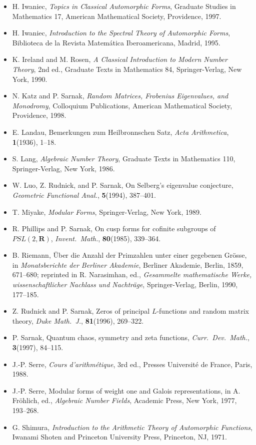 \begin{itemize}[leftmargin=4.6em,itemsep=0.22em,topsep=0.3em,label={}]
\item[{[I1]}] H. Iwaniec, \emph{Topics in Classical Automorphic Forms}, Graduate Studies in Mathematics 17, American Mathematical Society, Providence, 1997.
\item[{[I2]}] H. Iwaniec, \emph{Introduction to the Spectral Theory of Automorphic Forms}, Biblioteca de la Revista Matemática Iberoamericana, Madrid, 1995.
\item[{[IR]}] K. Ireland and M. Rosen, \emph{A Classical Introduction to Modern Number Theory}, 2nd ed., Graduate Texts in Mathematics 84, Springer-Verlag, New York, 1990.
\item[{[KS]}] N. Katz and P. Sarnak, \emph{Random Matrices, Frobenius Eigenvalues, and Monodromy}, Colloquium Publications, American Mathematical Society, Providence, 1998.
\item[{[L]}] E. Landau, Bemerkungen zum Heilbronnschen Satz, \emph{Acta Arithmetica}, \textbf{1}(1936), 1--18.
\item[{[La]}] S. Lang, \emph{Algebraic Number Theory}, Graduate Texts in Mathematics 110, Springer-Verlag, New York, 1986.
\item[{[LRS]}] W. Luo, Z. Rudnick, and P. Sarnak, On Selberg's eigenvalue conjecture, \emph{Geometric Functional Anal.}, \textbf{5}(1994), 387--401.
\item[{[Mi]}] T. Miyake, \emph{Modular Forms}, Springer-Verlag, New York, 1989.
\item[{[PS]}] R. Phillips and P. Sarnak, On cusp forms for cofinite subgroups of $PSL(2,\mathbf{R})$, \emph{Invent.\ Math.}, \textbf{80}(1985), 339--364.
\item[{[Rie]}] B. Riemann, Über die Anzahl der Primzahlen unter einer gegebenen Grösse, in \emph{Monatsberichte der Berliner Akademie}, Berliner Akademie, Berlin, 1859, 671--680; reprinted in R. Narasimhan, ed., \emph{Gesammelte mathematische Werke, wissenschaftlicher Nachlass und Nachträge}, Springer-Verlag, Berlin, 1990, 177--185.
\item[{[RS]}] Z. Rudnick and P. Sarnak, Zeros of principal $L$-functions and random matrix theory, \emph{Duke Math.\ J.}, \textbf{81}(1996), 269--322.
\item[{[Sa]}] P. Sarnak, Quantum chaos, symmetry and zeta functions, \emph{Curr.\ Dev.\ Math.}, \textbf{3}(1997), 84--115.
\item[{[Se1]}] J.-P. Serre, \emph{Cours d'arithmétique}, 3rd ed., Presses Université de France, Paris, 1988.
\item[{[Se2]}] J.-P. Serre, Modular forms of weight one and Galois representations, in A. Fröhlich, ed., \emph{Algebraic Number Fields}, Academic Press, New York, 1977, 193--268.
\item[{[Sh]}] G. Shimura, \emph{Introduction to the Arithmetic Theory of Automorphic Functions}, Iwanami Shoten and Princeton University Press, Princeton, NJ, 1971.


\end{itemize}
